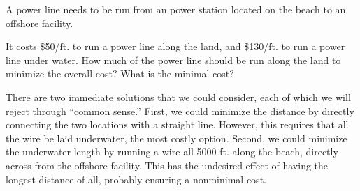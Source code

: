 \documentclass{ximera}
\begin{document}
\begin{example}
  A power line needs to be run from an power station located on the
  beach to an offshore facility.
  \begin{image}
  \end{image}
  It costs \$50/ft. to run a power line along the land, and \$130/ft. to
  run a power line under water. How much of the power line should be run
  along the land to minimize the overall cost? What is the minimal cost?
  \begin{explanation}
    There are two immediate solutions that we could consider, each of
    which we will reject through ``common sense.'' First, we could
    minimize the distance by directly connecting the two locations with a
    straight line. However, this requires that all the wire be laid
    underwater, the most costly option. Second, we could minimize the
    underwater length by running a wire all 5000 ft. along the beach,
    directly across from the offshore facility. This has the undesired
    effect of having the longest distance of all, probably ensuring a
    nonminimal cost.
    

\end{explanation}
\end{example}
\end{document}
